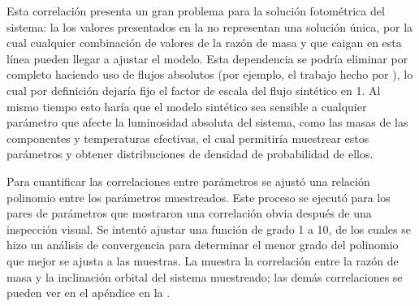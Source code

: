 Esta correlación presenta un gran problema para la solución fotométrica del
sistema: la los valores presentados en la
 no
representan una solución única, por la cual cualquier combinación de valores de
la razón de masa y  que caigan en esta línea pueden llegar a
ajustar el modelo. Esta dependencia se podría eliminar por completo haciendo uso
de flujos absolutos (por ejemplo, el trabajo hecho por
),
lo cual por definición dejaría fijo el factor de escala del flujo sintético en
1. Al mismo tiempo esto haría que el modelo sintético sea sensible a cualquier
parámetro que afecte la luminosidad absoluta del sistema, como las masas de las
componentes y temperaturas efectivas, el cual permitiría muestrear estos
parámetros y obtener distribuciones de densidad de probabilidad de ellos.

Para cuantificar las correlaciones entre parámetros se ajustó una relación
polinomio entre los parámetros muestreados. Este proceso se ejecutó para los
pares de parámetros que mostraron una correlación obvia después de una
inspección visual. Se intentó ajustar una función de grado 1 a 10, de los cuales
se hizo un análisis de convergencia para determinar el menor grado del polinomio
que mejor se ajusta a las muestras. La 
muestra la correlación entre la razón de masa y la inclinación orbital del
sistema muestreado; las demás correlaciones se pueden ver en el apéndice en la
.

